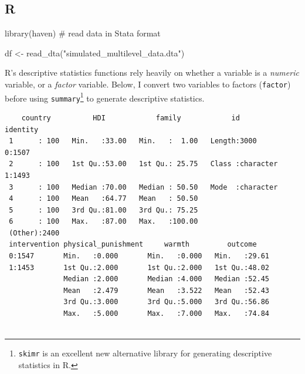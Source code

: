 \documentclass[
  letterpaper,
  DIV=11,
  numbers=noendperiod]{scrreprt}
\newenvironment{Shaded}{\begin{snugshade}}{\end{snugshade}}
\newcommand{\CommentTok}[1]{\textcolor[rgb]{0.37,0.37,0.37}{#1}}
\newcommand{\FunctionTok}[1]{\textcolor[rgb]{0.28,0.35,0.67}{#1}}
\newcommand{\NormalTok}[1]{\textcolor[rgb]{0.00,0.23,0.31}{#1}}
\newcommand{\OtherTok}[1]{\textcolor[rgb]{0.00,0.23,0.31}{#1}}
\newcommand{\SpecialCharTok}[1]{\textcolor[rgb]{0.37,0.37,0.37}{#1}}
\newcommand{\StringTok}[1]{\textcolor[rgb]{0.13,0.47,0.30}{#1}}
\begin{document}
\subsection{R}

\begin{Shaded}
\begin{Highlighting}[]
\FunctionTok{library}\NormalTok{(haven) }\CommentTok{\# read data in Stata format}

\NormalTok{df }\OtherTok{\textless{}{-}} \FunctionTok{read\_dta}\NormalTok{(}\StringTok{"simulated\_multilevel\_data.dta"}\NormalTok{)}
\end{Highlighting}
\end{Shaded}

R's descriptive statistics functions rely heavily on whether a variable
is a \emph{numeric} variable, or a \emph{factor} variable. Below, I
convert two variables to factors (\texttt{factor}) before using
\texttt{summary}\footnote{\texttt{skimr} is an excellent new alternative
  library for generating descriptive statistics in R.} to generate
descriptive statistics.

\begin{Shaded}
\end{Shaded}

\begin{verbatim}
    country          HDI            family            id            identity
 1      : 100   Min.   :33.00   Min.   :  1.00   Length:3000        0:1507  
 2      : 100   1st Qu.:53.00   1st Qu.: 25.75   Class :character   1:1493  
 3      : 100   Median :70.00   Median : 50.50   Mode  :character           
 4      : 100   Mean   :64.77   Mean   : 50.50                              
 5      : 100   3rd Qu.:81.00   3rd Qu.: 75.25                              
 6      : 100   Max.   :87.00   Max.   :100.00                              
 (Other):2400                                                               
 intervention physical_punishment     warmth         outcome     
 0:1547       Min.   :0.000       Min.   :0.000   Min.   :29.61  
 1:1453       1st Qu.:2.000       1st Qu.:2.000   1st Qu.:48.02  
              Median :2.000       Median :4.000   Median :52.45  
              Mean   :2.479       Mean   :3.522   Mean   :52.43  
              3rd Qu.:3.000       3rd Qu.:5.000   3rd Qu.:56.86  
              Max.   :5.000       Max.   :7.000   Max.   :74.84  
                                                                 
\end{verbatim}
\end{document}
